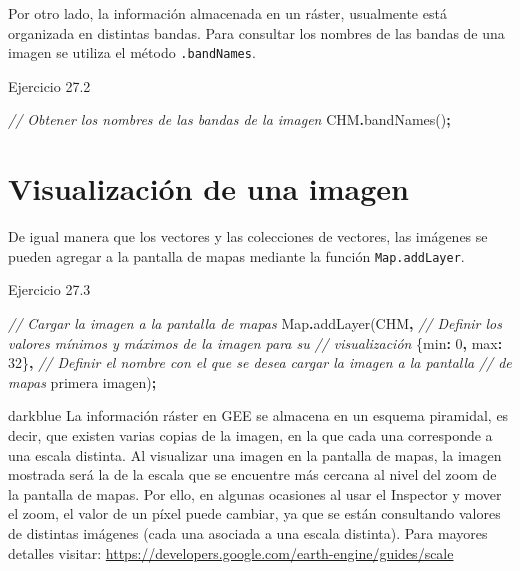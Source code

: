 \documentclass[
  12pt,
  letterpaper,
  twoside]{book}
\newenvironment{Shaded}{\begin{snugshade}}{\end{snugshade}}
\newcommand{\BuiltInTok}[1]{#1}
\newcommand{\CommentTok}[1]{\textcolor[rgb]{0.56,0.35,0.01}{\textit{#1}}}
\newcommand{\DataTypeTok}[1]{\textcolor[rgb]{0.13,0.29,0.53}{#1}}
\newcommand{\DecValTok}[1]{\textcolor[rgb]{0.00,0.00,0.81}{#1}}
\newcommand{\FunctionTok}[1]{\textcolor[rgb]{0.00,0.00,0.00}{#1}}
\newcommand{\NormalTok}[1]{#1}
\newcommand{\OperatorTok}[1]{\textcolor[rgb]{0.81,0.36,0.00}{\textbf{#1}}}
\newcommand{\StringTok}[1]{\textcolor[rgb]{0.31,0.60,0.02}{#1}}
\begin{document}
Por otro lado, la información almacenada en un ráster, usualmente está organizada en distintas bandas. Para consultar los nombres de las bandas de una imagen se utiliza el método \texttt{.bandNames}.

Ejercicio 27.2

\begin{Shaded}
\begin{Highlighting}[]
\CommentTok{// Obtener los nombres de las bandas de la imagen}
\NormalTok{CHM}\OperatorTok{.}\FunctionTok{bandNames}\NormalTok{()}\OperatorTok{;}
\end{Highlighting}
\end{Shaded}

\hypertarget{visualizaciuxf3n-de-una-imagen}{%
\section{Visualización de una imagen}\label{visualizaciuxf3n-de-una-imagen}}

De igual manera que los vectores y las colecciones de vectores, las imágenes se pueden agregar a la pantalla de mapas mediante la función \texttt{Map.addLayer}.

Ejercicio 27.3

\begin{Shaded}
\begin{Highlighting}[]
\CommentTok{// Cargar la imagen a la pantalla de mapas}
\BuiltInTok{Map}\OperatorTok{.}\FunctionTok{addLayer}\NormalTok{(CHM}\OperatorTok{,} 
  \CommentTok{// Definir los valores mínimos y máximos de la imagen para su }
  \CommentTok{// visualización}
\NormalTok{  \{}\DataTypeTok{min}\OperatorTok{:} \DecValTok{0}\OperatorTok{,} \DataTypeTok{max}\OperatorTok{:} \DecValTok{32}\NormalTok{\}}\OperatorTok{,} 
  \CommentTok{// Definir el nombre con el que se desea cargar la imagen a la pantalla }
  \CommentTok{// de mapas}
  \StringTok{\textquotesingle{}primera imagen\textquotesingle{}}\NormalTok{)}\OperatorTok{;}
\end{Highlighting}
\end{Shaded}

\begin{bluebox2}

\begin{awesomeblock}{5pt}{\faLightbulb}{darkblue}
La información ráster en GEE se almacena en un esquema piramidal, es decir, que existen varias copias de la imagen, en la que cada una corresponde a una escala distinta. Al visualizar una imagen en la pantalla de mapas, la imagen mostrada será la de la escala que se encuentre más cercana al nivel del zoom de la pantalla de mapas. Por ello, en algunas ocasiones al usar el Inspector y mover el zoom, el valor de un píxel puede cambiar, ya que se están consultando valores de distintas imágenes (cada una asociada a una escala distinta). Para mayores detalles visitar: \url{https://developers.google.com/earth-engine/guides/scale}

\end{awesomeblock}

\end{bluebox2}
\end{document}
